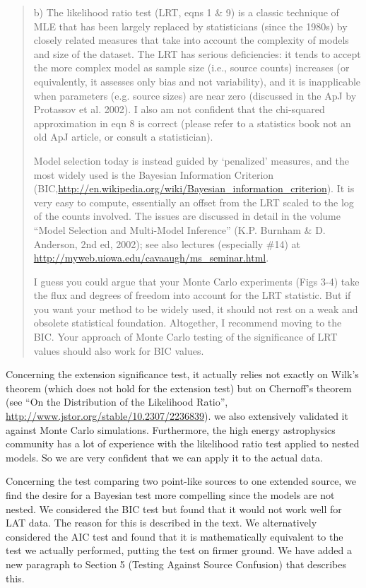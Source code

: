 \documentclass{article}
\newenvironment{referee}
{\begin{quote}\color{red}}
  {\end{quote}}
\newenvironment{reply}
  {}
  {}
\begin{document}
\begin{referee}
b) The likelihood ratio test (LRT, eqns 1 \& 9) is a classic technique of
MLE that has been largely replaced by statisticians (since the 1980s) by
closely related measures that take into account the complexity of models
and size of the dataset. The LRT has serious deficiencies: it tends
to accept the more complex model as sample size (i.e., source counts)
increases (or equivalently, it assesses only bias and not variability),
and it is inapplicable when parameters (e.g. source sizes) are near zero
(discussed in the ApJ by Protassov et al. 2002). I also am not confident
that the chi-squared approximation in eqn 8 is correct (please refer to
a statistics book not an old ApJ article, or consult a statistician).

Model selection today is instead guided by `penalized' measures,
and the most widely used is the Bayesian Information Criterion
(BIC,\url{http://en.wikipedia.org/wiki/Bayesian_information_criterion}). It
is very easy to compute, essentially an offset from the LRT scaled to
the log of the counts involved. The issues are discussed in detail in
the volume ``Model Selection and Multi-Model Inference'' (K.P. Burnham
\& D. Anderson, 2nd ed, 2002); see also lectures (especially \#14) at
\url{http://myweb.uiowa.edu/cavaaugh/ms_seminar.html}.


I guess you could argue that your Monte Carlo experiments (Figs 3-4) take
the flux and degrees of freedom into account for the LRT statistic. But
if you want your method to be widely used, it should not rest on a weak
and obsolete statistical foundation. Altogether, I recommend moving to
the BIC. Your approach of Monte Carlo testing of the significance of
LRT values should also work for BIC values.
\end{referee}


\begin{reply}
Concerning the extension significance test, it actually relies not exactly
on Wilk's theorem (which does not hold for the extension test)
but on Chernoff's theorem (see ``On the Distribution of the Likelihood 
Ratio'', \url{http://www.jstor.org/stable/10.2307/2236839}).
we also extensively validated it
against Monte Carlo simulations. Furthermore, the high energy astrophysics
community has a lot of experience with the likelihood ratio test applied to
nested models. So we are very confident that we can apply it to the actual
data.

Concerning the test comparing two point-like sources to one extended
source, we find the desire for a Bayesian test more compelling since the
models are not nested. We considered the BIC test but found that it would
not work well for LAT data. The reason for this is described in the text.
We alternatively considered the AIC test and
found that it is mathematically equivalent to the test we actually performed,
putting the test on firmer ground. We have
added a new paragraph to Section 5 (Testing Against Source Confusion)
that describes this.
\end{reply}
\end{document}
